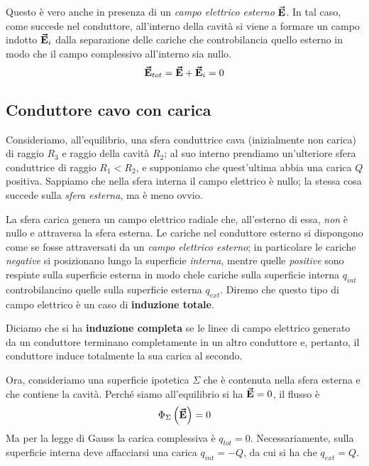 
Questo è vero anche in presenza di un \textit{campo elettrico esterno} $\vb*{\va{E}}$. In tal caso, come succede nel conduttore, all'interno della cavità si viene a formare un campo indotto $\vb*{\va{E}}_i$ dalla separazione delle cariche  che controbilancia quello esterno in modo che il campo complessivo all'interno sia nullo.
\begin{equation*}
	\vb*{\va{E}}_{tot}=\vb*{\va{E}}+\vb*{\va{E}}_i=0
\end{equation*}
\subsection{Conduttore cavo con carica}
Consideriamo, all'equilibrio, una sfera conduttrice cava (inizialmente non carica) di raggio $R_3$ e raggio della cavità $R_2$; al suo interno prendiamo un'ulteriore sfera conduttrice di raggio $R_1<R_2$, e supponiamo che quest'ultima abbia una carica $Q$ positiva.
Sappiamo che nella sfera interna il campo elettrico è nullo; la stessa cosa succede sulla \textit{sfera esterna}, ma è meno ovvio.

La sfera carica genera un campo elettrico radiale che, all'esterno di essa, \textit{non} è nullo e attraversa la sfera esterna. Le cariche nel conduttore esterno si dispongono come se fosse attraversati da un \textit{campo elettrico esterno}; in particolare le cariche \textit{negative} si posizionano lungo la superficie \textit{interna}, mentre quelle \textit{positive} sono respinte sulla superficie esterna in modo chele cariche sulla superficie interna $q_{int}$ controbilancino quelle sulla superficie esterna $q_{ext}$. Diremo che questo tipo di campo elettrico è un caso di \textbf{induzione totale}.
\begin{define}
	Diciamo che si ha \textbf{induzione completa} se le linee di campo elettrico generato da un conduttore terminano completamente in un altro conduttore e, pertanto, il conduttore induce totalmente la sua carica al secondo. 
\end{define}

Ora, consideriamo una superficie ipotetica $\Sigma$ che è contenuta nella sfera esterna e che contiene la cavità. Perché siamo all'equilibrio si ha $\vb*{\va{E}}=0$, il flusso è
\begin{equation*}
	\Phi_{\Sigma}\left(\vb*{\va{E}}\right)=0
\end{equation*}
Ma per la legge di Gauss la carica complessiva è $q_{tot}=0$. Necessariamente, sulla superficie interna deve affacciarsi una carica $q_{int}=-Q$, da cui si ha che $q_{ext}=Q$.

